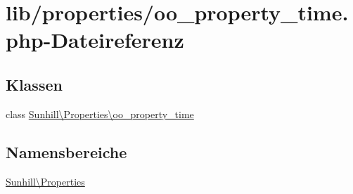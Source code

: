 \hypertarget{oo__property__time_8php}{}\section{lib/properties/oo\+\_\+property\+\_\+time.php-\/\+Dateireferenz}
\label{oo__property__time_8php}
\subsection*{Klassen}
\begin{DoxyCompactItemize}
\item 
class \hyperlink{classSunhill_1_1Properties_1_1oo__property__time}{Sunhill\textbackslash{}\+Properties\textbackslash{}oo\+\_\+property\+\_\+time}
\end{DoxyCompactItemize}
\subsection*{Namensbereiche}
\begin{DoxyCompactItemize}
\item 
 \hyperlink{namespaceSunhill_1_1Properties}{Sunhill\textbackslash{}\+Properties}
\end{DoxyCompactItemize}
